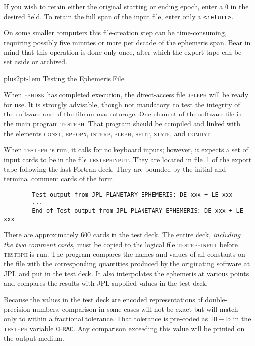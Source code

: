 \documentclass[twoside,11pt]{article}
\renewcommand{\_}{\texttt{\symbol{95}}}
\newcommand{\hdg}[1]{\vskip4pt plus2pt\leavevmode\kern-1em \underline{\large{#1}}\par}
\newcommand{\hdg}[1]{\subsection*{{#1}}}
\begin{document}
If you wish to retain either the original starting or ending epoch,
enter a 0 in the desired field. To retain the full span
of the input file, enter only a {\tt <return>}.
 
On some smaller computers this file-creation
step can be time-consuming, requiring possibly five minutes or
more per decade of the ephemeris span. Bear in mind that this
operation is done only once, after which the export tape
can be set aside or archived.
 
\hdg{Testing the Ephemeris File}

When \textsc{ephdsk} has completed execution, the direct-access file
\textsc{jpleph} will be ready for use. It is strongly advisable, though
not mandatory, to test the integrity of the software
and of the file on mass storage.
One element of the software file is the main program \textsc{testeph}.
That program should be compiled and linked with the elements
\textsc{const, ephopn, interp, pleph, split, state}, and \textsc{comdat}.
 
When \textsc{testeph} is run, it calls for no keyboard inputs; however,
it expects a set of input cards to be in the file \textsc{testephinput}.
They are located in file~1 of the export tape following the last
Fortran deck. They are bounded by the initial and terminal
comment cards of the form
\begin{verbatim}
        Test output from JPL PLANETARY EPHEMERIS: DE-xxx + LE-xxx
        ...
        End of Test output from JPL PLANETARY EPHEMERIS: DE-xxx + LE-xxx
\end{verbatim}
 
There are approximately 600 cards in the test deck. The entire deck, {\it
including the two comment cards}, must be copied to the  logical file
\textsc{testephinput} before \textsc{testeph} is run. The program compares
the names and values of all constants on the file with the
corresponding quantities produced by the originating software at
JPL and put in the test deck. It also interpolates the ephemeris
at various points and compares the results with JPL-supplied values
in the test deck.
 
Because the values in the test deck are encoded representations of
double-precision numbers, comparison in some cases will
not be exact but will match only to within a fractional tolerance.
That tolerance
is pre-coded as $10~{-15}$ in the \textsc{testeph} variable
{\tt CFRAC}. Any comparison exceeding this value will be
printed on the output medium.
 
\end{document}
